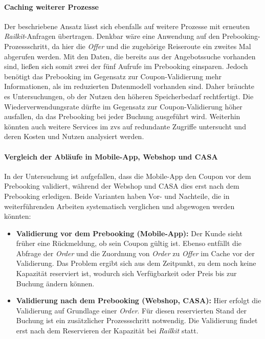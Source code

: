 \paragraph{Caching weiterer Prozesse}
Der beschriebene Ansatz lässt sich ebenfalls auf weitere Prozesse mit erneuten \textit{Railkit}-Anfragen übertragen. Denkbar wäre eine Anwendung auf den Prebooking-Prozessschritt, da hier die \textit{Offer} und die zugehörige Reiseroute ein zweites Mal abgerufen werden. Mit den Daten, die bereits aus der Angebotssuche vorhanden sind, ließen sich somit zwei der fünf Aufrufe im Prebooking einsparen. Jedoch benötigt das Prebooking im Gegensatz zur Coupon-Validierung mehr Informationen, als im reduzierten Datenmodell vorhanden sind. Daher bräuchte es Untersuchungen, ob der Nutzen den höheren Speicherbedarf rechtfertigt. Die Wiederverwendungsrate dürfte im Gegensatz zur Coupon-Validierung höher ausfallen, da das Prebooking bei jeder Buchung ausgeführt wird. Weiterhin könnten auch weitere Services im \ac{zvs} auf redundante Zugriffe untersucht und deren Kosten und Nutzen analysiert werden.

\paragraph{Vergleich der Abläufe in Mobile-App, Webshop und CASA}
In der Untersuchung ist aufgefallen, dass die Mobile-App den Coupon vor dem Prebooking validiert, während der Webshop und CASA dies erst nach dem Prebooking erledigen. Beide Varianten haben Vor- und Nachteile, die in weiterführenden Arbeiten systematisch verglichen und abgewogen werden könnten:

\begin{itemize}
    \item \textbf{Validierung vor dem Prebooking (Mobile-App):} Der Kunde sieht früher eine Rückmeldung, ob sein Coupon gültig ist. Ebenso entfällt die Abfrage der \textit{Order} und die Zuordnung von \textit{Order} zu \textit{Offer} im Cache vor der Validierung. Das Problem ergibt sich aus dem Zeitpunkt, zu dem noch keine Kapazität reserviert ist, wodurch sich Verfügbarkeit oder Preis bis zur Buchung ändern können.
    \item \textbf{Validierung nach dem Prebooking (Webshop, CASA):} Hier erfolgt die Validierung auf Grundlage einer \textit{Order}. Für diesen reservierten Stand der Buchung ist ein zusätzlicher Prozessschritt notwendig. Die Validierung findet erst nach dem Reservieren der Kapazität bei \textit{Railkit} statt.
\end{itemize}

